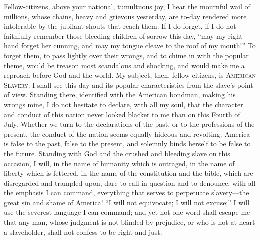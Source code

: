 Fellow-citizens, above your national, tumultuous joy, I hear the
mournful wail of millions, whose chains, heavy and grievous yesterday,
are to-day rendered more intolerable by the jubilant shouts that reach
them. If I do forget, if I do not faithfully remember those bleeding
children of sorrow this day, ``may my right hand forget her cunning, and
may my tongue cleave to the roof of my mouth!'' To forget them, to pass
lightly over their wrongs, and to chime in with the popular theme, would
be treason most scandalous and shocking, and would make me a reproach
before God and the world. My subject, then, fellow-citizens, is
\textsc{American Slavery}. I shall see this day and its popular
characteristics from the slave's point of view. Standing there,
identified with the American bondman, making his wrongs mine, I do not
hesitate to declare, with all my soul, that the character and conduct of
this nation never looked blacker to me than on this Fourth of July.
Whether we turn to the declarations of the past, or to the professions
of the present, the conduct of the nation seems equally hideous and
revolting. America is false to the past, false to the present, and
solemnly binds herself to be false to the future. Standing with God and
the crushed and bleeding slave on this occasion, I will, in the name of
humanity which is outraged, in the name of liberty which is fettered, in
the name of the constitution and the bible, which are disregarded and
trampled upon, dare to call in question and to denounce, with all the
emphasis I can command, everything that serves to perpetuate
slavery---the great sin and shame of America! ``I will not equivocate; I
will not excuse;'' I will use the severest language I can
{\protect\hypertarget{443}{}{}}command; and yet not one word shall
escape me that any man, whose judgment is not blinded by prejudice, or
who is not at heart a slaveholder, shall not confess to be right and
just.

